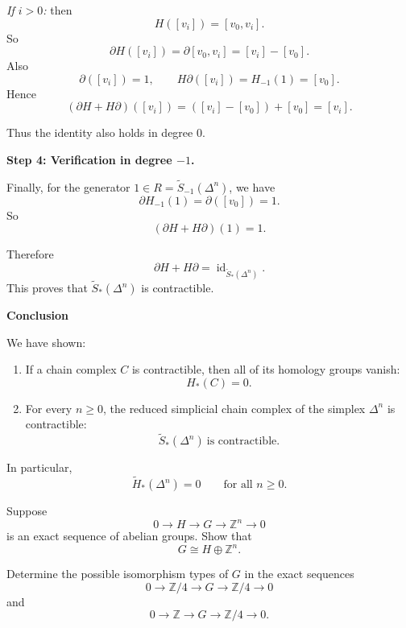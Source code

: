 \begin{solution}
\par

\noindent
\emph{If \(i>0\):} then
\[
H([v_i])=[v_0,v_i].
\]
So
\[
\partial H([v_i])=\partial [v_0,v_i]=[v_i]-[v_0].
\]
Also
\[
\partial([v_i])=1,
\qquad
H\partial([v_i])=H_{-1}(1)=[v_0].
\]
Hence
\[
(\partial H+H\partial)([v_i])
=
([v_i]-[v_0])+[v_0]
=
[v_i].
\]

Thus the identity also holds in degree \(0\).


\medskip
\noindent\textbf{Step 4: Verification in degree \(-1\).}\par
\smallskip


Finally, for the generator \(1\in R=\widetilde{S}_{-1}(\Delta^n)\), we have
\[
\partial H_{-1}(1)=\partial([v_0])=1.
\]
So
\[
(\partial H+H\partial)(1)=1.
\]

Therefore
\[
\partial H + H\partial=\operatorname{id}_{\widetilde{S}_*(\Delta^n)}.
\]
This proves that \(\widetilde{S}_*(\Delta^n)\) is contractible.


\medskip
\noindent\textbf{Conclusion}\par
\smallskip


We have shown:

\begin{enumerate}
	\item If a chain complex \(C\) is contractible, then all of its homology groups vanish:
	\[
	H_*(C)=0.
	\]
	\item For every \(n\ge 0\), the reduced simplicial chain complex of the simplex \(\Delta^n\) is contractible:
	\[
	\widetilde{S}_*(\Delta^n)\ \text{is contractible}.
	\]
\end{enumerate}

In particular,
\[
\widetilde{H}_*(\Delta^n)=0
\qquad \text{for all } n\ge 0.
\]
\end{solution}

\begin{problem}
Suppose
\[
0\longrightarrow H \longrightarrow G \longrightarrow \mathbb Z^n \longrightarrow 0
\]
is an exact sequence of abelian groups. Show that
\[
G\cong H\oplus \mathbb Z^n.
\]

Determine the possible isomorphism types of \(G\) in the exact sequences
\[
0\longrightarrow \mathbb Z/4 \longrightarrow G \longrightarrow \mathbb Z/4 \longrightarrow 0
\]
and
\[
0\longrightarrow \mathbb Z \longrightarrow G \longrightarrow \mathbb Z/4 \longrightarrow 0.
\]
\end{problem}

